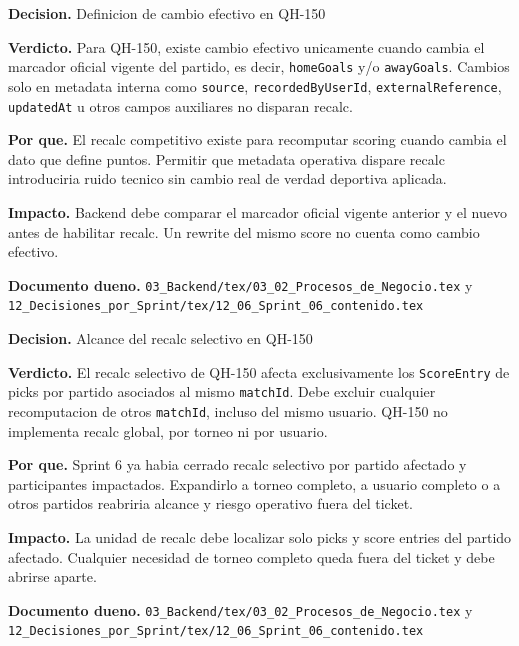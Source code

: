 \begin{docnote}
\textbf{Decision.} Definicion de cambio efectivo en QH-150

\textbf{Verdicto.} Para QH-150, existe cambio efectivo unicamente cuando cambia el marcador oficial vigente del partido, es decir, \texttt{homeGoals} y/o \texttt{awayGoals}. Cambios solo en metadata interna como \texttt{source}, \texttt{recordedByUserId}, \texttt{externalReference}, \texttt{updatedAt} u otros campos auxiliares no disparan recalc.

\textbf{Por que.} El recalc competitivo existe para recomputar scoring cuando cambia el dato que define puntos. Permitir que metadata operativa dispare recalc introduciria ruido tecnico sin cambio real de verdad deportiva aplicada.

\textbf{Impacto.} Backend debe comparar el marcador oficial vigente anterior y el nuevo antes de habilitar recalc. Un rewrite del mismo score no cuenta como cambio efectivo.

\textbf{Documento dueno.} \texttt{03\_Backend/tex/03\_02\_Procesos\_de\_Negocio.tex} y \texttt{12\_Decisiones\_por\_Sprint/tex/12\_06\_Sprint\_06\_contenido.tex}
\end{docnote}

\begin{docnote}
\textbf{Decision.} Alcance del recalc selectivo en QH-150

\textbf{Verdicto.} El recalc selectivo de QH-150 afecta exclusivamente los \texttt{ScoreEntry} de picks por partido asociados al mismo \texttt{matchId}. Debe excluir cualquier recomputacion de otros \texttt{matchId}, incluso del mismo usuario. QH-150 no implementa recalc global, por torneo ni por usuario.

\textbf{Por que.} Sprint 6 ya habia cerrado recalc selectivo por partido afectado y participantes impactados. Expandirlo a torneo completo, a usuario completo o a otros partidos reabriria alcance y riesgo operativo fuera del ticket.

\textbf{Impacto.} La unidad de recalc debe localizar solo picks y score entries del partido afectado. Cualquier necesidad de torneo completo queda fuera del ticket y debe abrirse aparte.

\textbf{Documento dueno.} \texttt{03\_Backend/tex/03\_02\_Procesos\_de\_Negocio.tex} y \texttt{12\_Decisiones\_por\_Sprint/tex/12\_06\_Sprint\_06\_contenido.tex}
\end{docnote}

